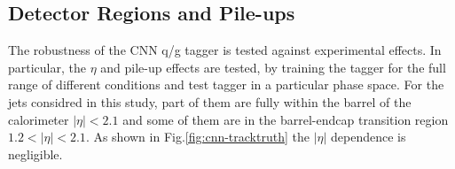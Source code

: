 

\subsection{Detector Regions and Pile-ups}
\label{sec:cnn-detectorregion}

The robustness of the CNN q/g tagger is tested against experimental effects. In particular, the $\eta$ and pile-up effects are tested,
by training the tagger for the full range of different conditions and test tagger in a particular phase space.
For the jets considred in this study, part of them are fully within the barrel of the calorimeter $|\eta|<2.1$ and some of them
are in the barrel-endcap transition region $1.2<|\eta|<2.1$. As shown in Fig.\ref{fig:cnn-tracktruth} the $|\eta|$ dependence is negligible. 


